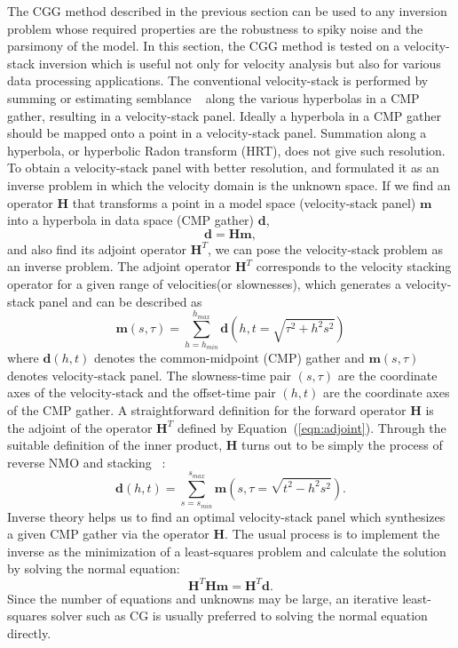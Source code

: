 The CGG method described in the previous section can be used to any inversion problem 
whose required properties are the robustness to spiky noise and the parsimony of the model.
In this section, the CGG method is tested on a velocity-stack inversion
which is useful not only for velocity analysis 
but also for various data processing applications.
The conventional velocity-stack
is performed by summing or estimating semblance ~\cite{GEO34-06-08590881}
along the various hyperbolas in a CMP gather, 
resulting in a velocity-stack panel.
Ideally a hyperbola in a CMP gather should be mapped 
onto a point in a velocity-stack panel. 
Summation along a hyperbola, or hyperbolic Radon transform (HRT), 
does not give such resolution.
To obtain a velocity-stack panel with better resolution,
\cite{GEO50-12-27272741} and \cite{Hampson-22-044055}
formulated it as an inverse problem in which the velocity
domain is the unknown space.  
If we find an operator $\mathbf H$ that transforms 
a point in a model space (velocity-stack panel) $\mathbf m$ 
into a hyperbola in data space (CMP gather) $\mathbf d$, 
\begin{equation}
\mathbf d = \mathbf H \mathbf m ,
\end{equation}
and also find its adjoint operator $\mathbf H^T$,
we can pose the velocity-stack problem as an inverse problem.
The adjoint operator $\mathbf H^T$ corresponds to the velocity stacking operator 
for a given range of velocities(or slownesses), which generates a velocity-stack panel 
and can be described as
\begin{equation}
{\mathbf m}(s,\tau) = \sum_{h=h_{min}}^{h_{max}} {\mathbf d}(h,t=\sqrt{\tau^2+h^2 s^2})
\label{eqn:adjoint}
\end{equation}
where ${\mathbf d(h,t)}$ denotes the common-midpoint (CMP) gather and 
${\mathbf m}(s,\tau)$ denotes velocity-stack panel. 
The slowness-time pair $(s,\tau)$ are the coordinate axes of the velocity-stack 
and the offset-time pair $(h,t)$ are the coordinate axes of the CMP gather.
A straightforward definition for the forward operator $\mathbf H$ is the adjoint 
of the operator $\mathbf H^T$ defined by Equation~(\ref{eqn:adjoint}). 
Through the suitable definition of the inner product, 
$\mathbf H$ turns out to be simply the process of reverse NMO and stacking ~\cite[]{GEO50-12-27272741}:
\begin{equation}
{\mathbf d}(h,t) = \sum_{s=s_{min}}^{s_{max}} {\mathbf m}(s,\tau = \sqrt{t^2-h^2 s^2}).
\end{equation}
Inverse theory helps us to find an optimal velocity-stack panel which synthesizes
a given CMP gather via the operator $\mathbf H$.
The usual process is to implement the inverse as the minimization 
of a least-squares problem and calculate the solution by solving
the normal equation:
\begin{equation}
\mathbf H^T \mathbf H \mathbf m = \mathbf H^T \mathbf d.
\end{equation}
Since the number of equations and unknowns may be large, 
an iterative least-squares solver such as CG is 
usually preferred to solving the normal equation directly.

